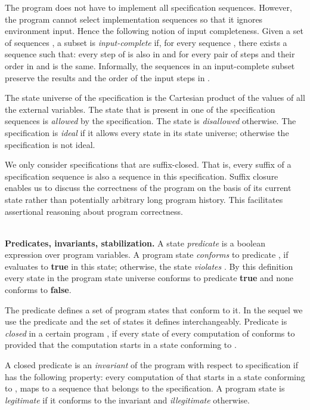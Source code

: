 \documentclass[11pt]{llncs}
\def\PROG#1{}
\begin{document}
The program does not have to implement all specification
sequences. However, the program cannot select implementation sequences
so that it ignores environment input. Hence the following notion of
input completeness.  Given a set of sequences \PROG{A}, a subset
 is \emph{input-complete} if, for every
sequence , there exists a sequence  such that: every step  of  is also in 
and for every pair of steps  and  their order in 
and  is the same. Informally, the sequences in an
input-complete subset \PROG{B} preserve the results and the order of
the input steps in \PROG{A}.


The state universe of the specification is the Cartesian product of
the values of all the external variables. The state that is present in
one of the specification sequences is \emph{allowed} by the
specification. The state is \emph{disallowed} otherwise. The
specification is \emph{ideal} if it allows every state in its state
universe; otherwise the specification is not ideal.

We only consider specifications that are suffix-closed. That is, every
suffix of a specification sequence is also a sequence in this
specification. Suffix closure enables us to discuss the correctness of
the program on the basis of its current state rather than potentially
arbitrary long program history. This facilitates assertional reasoning
about program correctness.

\ \\ \textbf{Predicates, invariants, stabilization.} A state
\emph{predicate} is a boolean expression over program variables. A
program state \emph{conforms} to predicate , if  evaluates to
\textbf{true} in this state; otherwise, the state \emph{violates} .
By this definition every state in the program state universe conforms
to predicate \textbf{true} and none conforms to \textbf{false}.

The predicate defines a set of program states that conform to it. In
the sequel we use the predicate and the set of states it defines
interchangeably. Predicate  is \emph{closed} in a certain program
\PROG{P}, if every state of every computation of \PROG{P} conforms to
 provided that the computation starts in a state conforming to .

A closed predicate  is an \emph{invariant} of the program \PROG{P}
with respect to specification \PROG{S} if  has the following
property: every computation of \PROG{P} that starts in a state
conforming to , maps to a sequence that belongs to the
specification.  A program state is \emph{legitimate} if it conforms to
the invariant and \emph{illegitimate} otherwise. 
\end{document}
